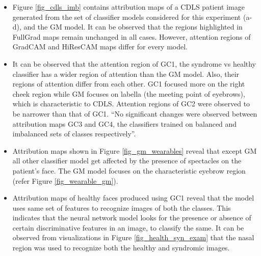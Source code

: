 \documentclass[../report.tex]{subfiles}
\begin{document}
	\begin{itemize}
	
			
		\item Figure \ref{fig_cdls_imb} contains attribution maps of a CDLS patient image generated from the set of classifier models considered for this experiment (a-d), and the GM model. It can be observed that the regions highlighted in FullGrad maps remain unchanged in all cases. However, attention regions of GradCAM and HiResCAM maps differ for every model.
				
		\item It can be observed that the attention region of GC1, the syndrome vs healthy classifier has a wider region of attention than the GM model. Also, their regions of attention differ from each other. GC1 focused more on the right cheek region while GM focuses on labella (the meeting point of eyebrows), which is characteristic to CDLS. Attention regions of GC2 were observed to be narrower than that of GC1. \enquote {No significant changes were observed between attribution maps GC3 and GC4, the classifiers trained on balanced and imbalanced sets of classes respectively}.
		
		\item Attribution maps shown in Figure \ref{fig_gm_wearables} reveal that except GM all other classifier model get affected by the presence of spectacles on the patient's face. The GM model focuses on the characteristic eyebrow region (refer Figure \ref{fig_wearable_gm}).
		
		\item Attribution maps of healthy faces produced using GC1 reveal that the model uses same set of features to recognize images of both the classes. This indicates that the neural network model looks for the presence or absence of certain discriminative features in an image, to classify the same. It can be observed from visualizations in Figure \ref{fig_health_syn_exam} that the nasal region was used to recognize both the healthy and syndromic images.
		\end{itemize}
	
\end{document}
